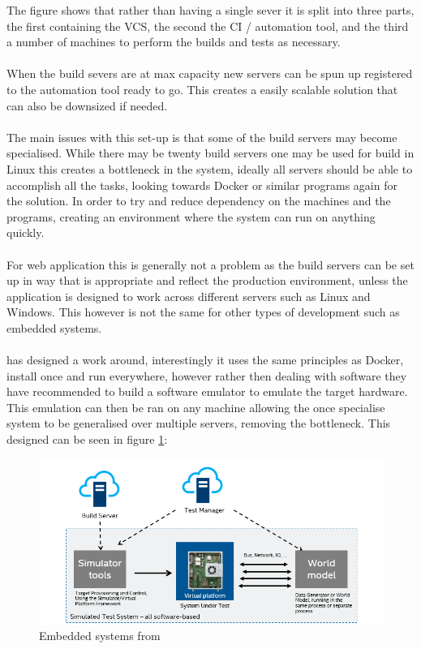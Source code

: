 The figure shows that rather than having a single sever it is split into three parts, the first containing the VCS, the second the CI / automation tool, and the third a number of machines to perform the builds and tests as necessary.
\\\\
When the build severs are at max capacity new servers can be spun up registered to the automation tool ready to go. This creates a easily scalable solution that can also be downsized if needed.
\\\\
The main issues with this set-up is that some of the build servers may become specialised. While there may be twenty build servers one may be used for build in Linux this creates a bottleneck in the system, ideally all servers should be able to accomplish all the tasks, looking towards Docker or similar programs again for the solution. In order to try and reduce dependency on the machines  and the programs, creating an environment where the system can run on anything quickly.
\\\\
For web application this is generally not a problem as the build servers can be set up in way  that is appropriate and reflect the production environment, unless the application is designed to work across different servers such as Linux and Windows. This however is not the same for other types of development such as embedded systems.
\\\\
\cite{intel} has designed a work around, interestingly it uses the same principles as Docker, install once and run everywhere, however rather then dealing with software they have recommended to build a software emulator to emulate the target hardware. This emulation can then be ran on any machine allowing the once specialise system to be generalised over multiple servers, removing the bottleneck. This designed can be seen in figure \ref{fig:intel}:

\begin{figure}[H]
	\centering
	\includegraphics[scale=0.7]{images/intel.png}
	\caption{Embedded systems from \cite{intel}}
	\label{fig:intel}
\end{figure}


